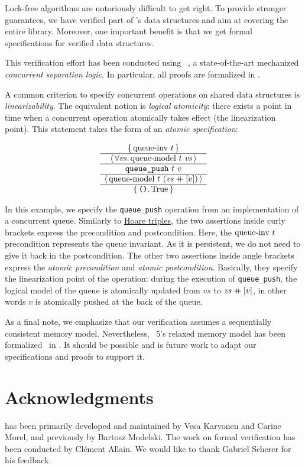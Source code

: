 \documentclass[a4paper, 11pt]{article}
\begin{document}
Lock-free algorithms are notoriously difficult to get right.
To provide stronger guarantees, we have verified part of \Saturn's data structures and aim at covering the entire library.
Moreover, one important benefit is that we get formal specifications for verified data structures.

This verification effort has been conducted using \Iris~\cite{DBLP:journals/jfp/JungKJBBD18}, a state-of-the-art mechanized \emph{concurrent separation logic}.
In particular, all proofs are formalized in \Coq.

A common criterion to specify concurrent operations on shared data structures is \emph{linearizability}.
The equivalent \Iris notion is \emph{logical atomicity}: there exists a point in time when a concurrent operation atomically takes effect (the linearization point).
This statement takes the form of an \emph{atomic specification}:

\[
  \begin{array}{c} \left\lbrace\, 
    \mathrm{queue {\hbox{-}} inv}\ t
   \,\right\rbrace \\ \hline \left\langle\, \forall 
    \mathit{vs}
   \ldotp 
    \mathrm{queue {\hbox{-}} model}\ t\  \mathit{vs}
   \,\right\rangle \\ \hline 
    \texttt{queue\_push}\ t\ v
   \\ \hline \left\langle\, 
    \mathrm{queue {\hbox{-}} model}\ t\  (\mathit{vs} \mathbin{+\mkern-10mu+} [v])
   \,\right\rangle \\ \hline \left\lbrace\, 
    \texttt{()}
   \ldotp 
    \mathrm{True}
   \,\right\rbrace \end{array}
\]

In this example, we specify the \texttt{queue\_push} operation from an implementation of a concurrent queue.
Similarly to \href{https://en.wikipedia.org/wiki/Hoare_logic}{Hoare triples}, the two assertions inside curly brackets express the precondition and postcondition.
Here, the $\mathrm{queue {\hbox{-}} inv}\ t$ precondition represents the queue invariant.
As it is persistent, we do not need to give it back in the postcondition.
The other two assertions inside angle brackets express the \emph{atomic precondition} and \emph{atomic postcondition}.
Basically, they specify the linearization point of the operation: during the execution of \texttt{queue\_push}, the logical model of the queue is atomically updated from $\mathit{vs}$ to $\mathit{vs} \mathbin{+\mkern-10mu+} [v]$, in other words $v$ is atomically pushed at the back of the queue.

As a final note, we emphasize that our verification assumes a sequentially consistent memory model.
Nevertheless, \OCaml~5's relaxed memory model has been formalized~\cite{DBLP:journals/pacmpl/MevelJP20} in \Iris.
It should be possible and is future work to adapt our specifications and proofs to support it.


\section{Acknowledgments}

\Saturn has been primarily developed and maintained by Vesa Karvonen and Carine Morel, and previously by Bartosz Modelski. The work on formal verification has been conducted by Clément Allain. We would like to thank Gabriel Scherer for his feedback.

\printbibliography
\end{document}

